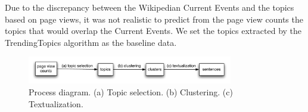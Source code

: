 \documentclass[11pt]{article}
\begin{document}
Due to the discrepancy between the Wikipedian Current Events and the topics based on page views, it was not realistic to predict from the page view counts the topics that would overlap the Current Events. We set the topics extracted by the TrendingTopics algorithm as the baseline data.

\begin{figure}
\centering
\includegraphics[width=0.8\textwidth]{figures/acl11-process.pdf}
\caption{Process diagram. (a) Topic selection. (b) Clustering. (c) Textualization.}
\label{fig:process}
\end{figure}




\end{document}
